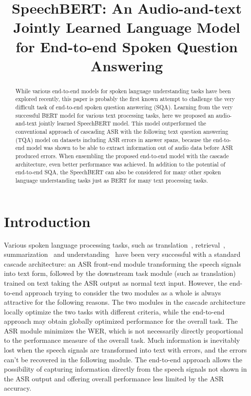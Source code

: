 \documentclass[a4paper]{article}
\title{SpeechBERT: An Audio-and-text Jointly Learned Language Model \\for End-to-end Spoken Question Answering}
\begin{document}
\maketitle

\begin{abstract}
While various end-to-end models for spoken language understanding tasks have been explored recently, this paper is probably the first known attempt to challenge the very difficult task of end-to-end spoken question answering (SQA).
Learning from the very successful BERT model for various text processing tasks, here we proposed an audio-and-text jointly learned SpeechBERT model. This model outperformed the conventional approach of cascading ASR with the following text question answering (TQA) model on datasets including ASR errors in answer spans, because the end-to-end model was shown to be able to extract information out of audio data before ASR produced errors. When ensembling the proposed end-to-end model with the cascade architecture, even better performance was achieved. In addition to the potential of end-to-end SQA, the SpeechBERT can also be considered for many other spoken language understanding tasks just as BERT for many text processing tasks. 
\end{abstract} 
\vspace{-10pt}
\section{Introduction}
\label{sec:intro}

\vspace{-5pt}

Various spoken language processing tasks, such as translation~\cite{berard2016listen}, retrieval~\cite{lee2015spoken}, summarization~\cite{lu2017order} and understanding~\cite{serdyuk2018towards} have been very successful with a standard cascade architecture: an ASR front-end module transforming the speech signals into text form, followed by the downstream task module (such as translation) trained on text taking the ASR output as normal text input. However, the end-to-end approach trying to consider the two modules as a whole is always attractive for the following reasons. The two modules in the cascade architecture locally optimize the two tasks with different criteria, while the end-to-end approach may obtain globally optimized performance for the overall task. The ASR module minimizes the WER, which is not necessarily directly proportional to the performance measure of the overall task. Much information is inevitably lost when the speech signals are transformed into text with errors, and the errors can't be recovered in the following module. 
The end-to-end approach allows the possibility of capturing information directly from the speech signals not shown in the ASR output and offering overall performance less limited by the ASR accuracy.
\end{document}
